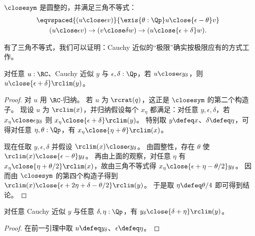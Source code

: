 \begin{cor}
  $\closesym$ 是圆整的，并满足三角不等式：
    \begin{gather}
      \eqvspaced{
        (u \close\epsilon v)
      }{
        \exis{\theta : \Qp} u \close{\epsilon - \theta} v
      }\\
      (u\close\epsilon v) \to (v\close\delta w) \to (u\close{\epsilon+\delta} w). \label{item:RC-sim-triangle}
    \end{gather}
\end{cor}

有了三角不等式，我们可以证明：Cauchy 近似的“极限”确实按极限应有的方式工作。

\begin{lem}\label{thm:RC-sim-lim}
  对任意 $u:\RC$、Cauchy 近似 $y$ 与 $\epsilon,\delta:\Qp$，若 $u\close\epsilon y_\delta$，则 $u\close{\epsilon+\delta} \rclim(y)$。
\end{lem}
\begin{proof}
  对 $u$ 用 $\RC$-归纳。
  若 $u$ 为 $\rcrat(q)$，这正是 $\closesym$ 的第二个构造子。
  现设 $u$ 为 $\rclim(x)$，并归纳假设每个 $x_\eta$ 都满足：对任意 $y,\epsilon,\delta$，若 $x_\eta\close\epsilon y_\delta$ 则 $x_\eta \close{\epsilon+\delta} \rclim(y)$。
  特别取 $y\defeq x$、$\delta\defeq\eta$，可得对任意 $\eta,\theta:\Qp$，有 $x_\eta \close{\eta+\theta} \rclim(x)$。

  现在任取 $y,\epsilon,\delta$ 并假设 $\rclim(x) \close\epsilon y_\delta$。
  由圆整性，存在 $\theta$ 使 $\rclim(x) \close{\epsilon-\theta} y_\delta$。
  再由上面的观察，对任意 $\eta$ 有 $x_\eta \close{\eta+\theta/2} \rclim(x)$，故由三角不等式得 $x_\eta \close{\epsilon+\eta-\theta/2} y_\delta$。
  因而由 $\closesym$ 的第四个构造子得到 $\rclim(x) \close{\epsilon+2\eta+\delta-\theta/2} \rclim(y)$。
  于是取 $\eta \defeq \theta/4$ 即可得到结论。
\end{proof}

\begin{lem}\label{thm:RC-sim-lim-term}
  对任意 Cauchy 近似 $y$ 与任意 $\delta,\eta:\Qp$，有 $y_\delta \close{\delta+\eta} \rclim(y)$。
\end{lem}
\begin{proof}
  在前一引理中取 $u\defeq y_\delta$、$\epsilon\defeq \eta$。
\end{proof}

